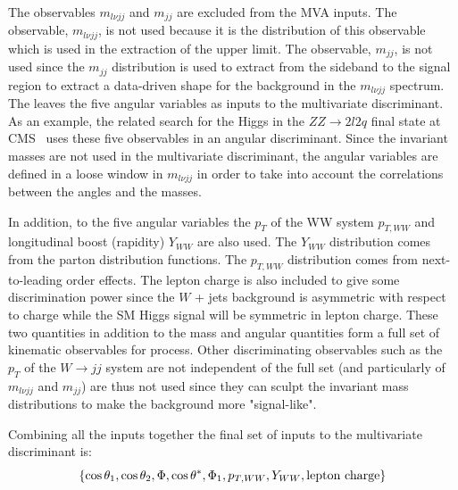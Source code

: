 The observables $m_{l\nu jj}$ and $m_{jj}$ are excluded from the MVA
inputs.  The observable, $m_{l\nu jj}$, is not used because it is the
distribution of this observable which is used in the extraction of the
upper limit.  The observable, $m_{jj}$, is not used since the $m_{jj}$
distribution is used to extract from the sideband to the signal region
to extract a data-driven shape for the background in the $m_{l\nu jj}$
spectrum.  The leaves the five angular variables as inputs to the
multivariate discriminant.  As an example, the related search for the
Higgs in the $ZZ \to 2l2q$ final state at CMS~\cite{CMS2l2q} uses
these five observables in an angular discriminant.  Since the
invariant masses are not used in the multivariate discriminant, the
angular variables are defined in a loose window in $m_{l\nu jj}$ in
order to take into account the correlations between the angles and the
masses.

In addition, to the five angular variables the $p_T$ of the WW system
$p_{T,WW}$ and longitudinal boost (rapidity) $Y_{WW}$ are also used.
The $Y_{WW}$ distribution comes from the parton distribution
functions.  The $p_{T,WW}$ distribution comes from next-to-leading
order effects.  The lepton charge is also included to give some
discrimination power since the $W$ + jets background is asymmetric
with respect to charge while the SM Higgs signal will be symmetric in
lepton charge.  These two quantities in addition to the mass and
angular quantities form a full set of kinematic observables for
process.  Other discriminating observables such as the $p_T$ of the
$W\to jj$ system are not independent of the full set (and particularly
of $m_{l\nu jj}$ and $m_{jj}$) are thus not used since they can sculpt
the invariant mass distributions to make the background more
"signal-like".

Combining all the inputs together the final set of inputs to the multivariate discriminant is:
\begin{equation}
\{ \cos\theta_1, \cos\theta_2, \Phi, \cos\theta^{\ast}, \Phi_1, p_{T,WW}, Y_{WW}, {\rm lepton~charge}\}
\end{equation}


